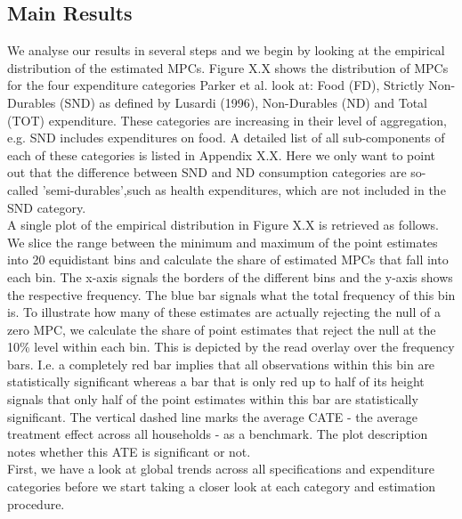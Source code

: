 \subsection{Main Results}
We analyse our results in several steps and we begin by looking at the empirical distribution of the estimated MPCs. Figure X.X shows the distribution of MPCs for the four expenditure categories Parker et al. look at: Food (FD), Strictly Non-Durables (SND) as defined by Lusardi (1996), Non-Durables (ND) and Total (TOT) expenditure. These categories are increasing in their level of aggregation, e.g. SND includes expenditures on food. A detailed list of all sub-components of each of these categories is listed in Appendix X.X. Here we only want to point out that the difference between SND and ND consumption categories are so-called 'semi-durables',such as health expenditures, which are not included in the SND category. \\
A single plot of the empirical distribution in Figure X.X is retrieved as follows. We slice the range between the minimum and maximum of the point estimates into 20 equidistant bins and calculate the share of estimated MPCs that fall into each bin. The x-axis signals the borders of the different bins and the y-axis shows the respective frequency. The blue bar signals what the total frequency of this bin is. To illustrate how many of these estimates are actually rejecting the null of a zero MPC, we calculate the share of point estimates that reject the null at the 10\% level within each bin. This is depicted by the read overlay over the frequency bars. I.e. a completely red bar implies that all observations within this bin are statistically significant whereas a bar that is only red up to half of its height signals that only half of the point estimates within this bar are statistically significant. The vertical dashed line marks the average CATE - the average treatment effect across all households - as a benchmark. The plot description notes whether this ATE is significant or not. \\ 
First, we have a look at global trends across all specifications and expenditure categories before we start taking a closer look at each category and estimation procedure. \\
